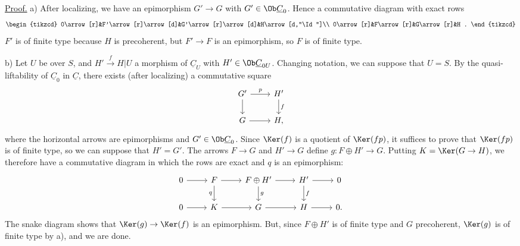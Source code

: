 \uline{Proof.} a) After localizing, we have an epimorphism \(G'\to G\) with \(G'\in\Ob\underline{C}_0\). Hence a commutative diagram with exact rows
\[
\begin{tikzcd}
0\arrow[r]&F'\arrow[r]\arrow[d]&G'\arrow[r]\arrow[d]&H\arrow[d,"\Id"]\\
0\arrow[r]&F\arrow[r]&G\arrow[r]&H .
\end{tikzcd}
\]
\(F'\) is of finite type because \(H\) is precoherent, but \(F'\to F\) is an epimorphism, so \(F\) is of finite type.

b) Let \(U\) be over \(S\), and \(H'\xrightarrow{f}H|U\) a morphism of \(\underline{C}_U\) with \(H'\in\Ob\underline{C}_{0U}\). Changing notation, we can suppose that \(U=S\). By the quasi-liftability of \(\underline{C}_0\) in \(\underline{C}\), there exists (after localizing) a commutative square
\[
\begin{tikzcd}
G' \arrow[r,"p"] \arrow[d] & H' \arrow[d,"f"]\\
G \arrow[r] & H,
\end{tikzcd}
\]
%
where the horizontal arrows are epimorphisms and \(G'\in\Ob\underline{C}_0\). Since \(\Ker(f)\) is a quotient of \(\Ker(fp)\), it suffices to prove that \(\Ker(fp)\) is of finite type, so we can suppose that \(H'=G'\). The arrows \(F\to G\) and \(H'\to G\) define \(g:F\oplus H'\to G\). Putting \(K=\Ker(G\to H)\), we therefore have a commutative diagram in which the rows are exact and \(q\) is an epimorphism:
\[
\begin{tikzcd}
0\arrow[r]&F\arrow[r]\arrow[d,"q"']&F\oplus H'\arrow[r]\arrow[d,"g"]&H'\arrow[r]\arrow[d,"f"]&0\\
0\arrow[r]&K\arrow[r]&G\arrow[r]&H\arrow[r]&0 .
\end{tikzcd}
\]
The snake diagram shows that \(\Ker(g)\to\Ker(f)\) is an epimorphism. But, since \(F\oplus H'\) is of finite type and \(G\) precoherent, \(\Ker(g)\) is of finite type by a), and we are done.

